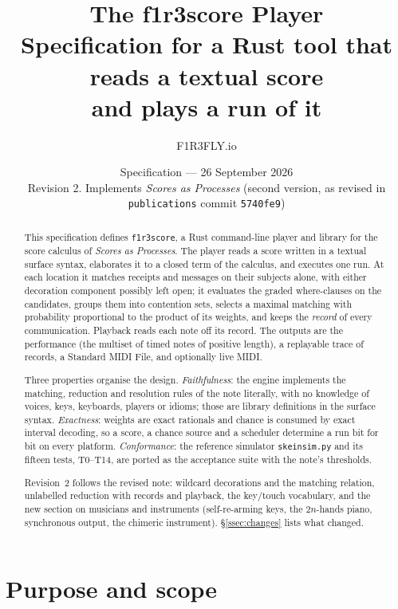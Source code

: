 \documentclass[11pt,a4paper]{article}
\title{\bfseries The f1r3score Player\\[4pt]
\large Specification for a Rust tool that reads a textual score\\
and plays a run of it}
\author{F1R3FLY.io}
\date{Specification --- 26 September 2026\\[2pt]
\normalsize Revision 2. Implements \emph{Scores as Processes} (second version,
as revised in \texttt{publications} commit \texttt{5740fe9})}
\theoremstyle{definition}
\theoremstyle{remark}
\newcommand{\cmd}[1]{\texttt{#1}}
\begin{document}
\maketitle

\begin{abstract}
This specification defines \cmd{f1r3score}, a Rust command-line player and
library for the score calculus of \emph{Scores as Processes}. The player reads a
score written in a textual surface syntax, elaborates it to a closed term of the
calculus, and executes one run. At each location it matches receipts and
messages on their subjects alone, with either decoration component possibly
left open; it evaluates the graded where-clauses on the candidates, groups them
into contention sets, selects a maximal matching with probability proportional
to the product of its weights, and keeps the \emph{record} of every
communication. Playback reads each note off its record. The outputs are the
performance (the multiset of timed notes of positive length), a replayable
trace of records, a Standard MIDI File, and optionally live MIDI.

Three properties organise the design. \emph{Faithfulness}: the engine
implements the matching, reduction and resolution rules of the note literally,
with no knowledge of voices, keys, keyboards, players or idioms; those are
library definitions in the surface syntax. \emph{Exactness}: weights are exact
rationals and chance is consumed by exact interval decoding, so a score, a
chance source and a scheduler determine a run bit for bit on every platform.
\emph{Conformance}: the reference simulator \texttt{skeinsim.py} and its fifteen
tests, T0--T14, are ported as the acceptance suite with the note's thresholds.

Revision~2 follows the revised note: wildcard decorations and the matching
relation, unlabelled reduction with records and playback, the key/touch
vocabulary, and the new section on musicians and instruments (self-re-arming
keys, the $2n$-hands piano, synchronous output, the chimeric instrument).
\S\ref{ssec:changes} lists what changed.
\end{abstract}

\tableofcontents

\section{Purpose and scope}\label{sec:scope}
\end{document}
